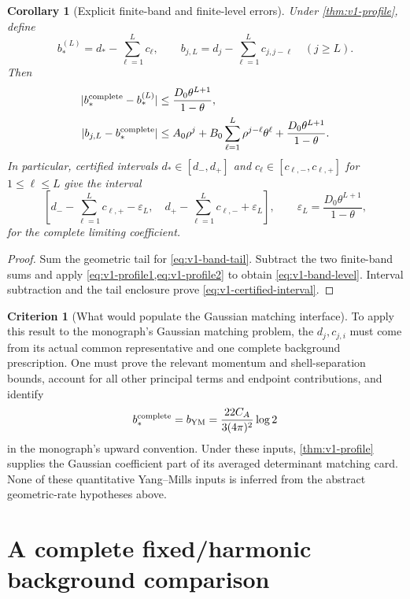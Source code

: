 \documentclass[11pt,a4paper]{article}
\newtheorem{corollary}[corollary]{Corollary}
\theoremstyle{definition}
\newtheorem{criterion}[criterion]{Criterion}
\theoremstyle{remark}
\begin{document}
\begin{corollary}[Explicit finite-band and finite-level errors]
\label{cor:v1-band}
Under \cref{thm:v1-profile}, define
\[
 b_*^{(L)}=d_*-\sum_{\ell=1}^{L}c_\ell,\qquad
 b_{j,L}=d_j-\sum_{\ell=1}^{L}c_{j,j-\ell}\quad(j\ge L).
\]
Then
\begin{align}
 |b_*^{\rm complete}-b_*^{(L)}|
       &\le \frac{D_0\theta^{L+1}}{1-\theta},\label{eq:v1-band-tail}\\
 |b_{j,L}-b_*^{\rm complete}|
       &\le A_0\rho^j
          +B_0\sum_{\ell=1}^{L}\rho^{j-\ell}\theta^\ell
          +\frac{D_0\theta^{L+1}}{1-\theta}.
                                             \label{eq:v1-band-level}
\end{align}
In particular, certified intervals
$d_*\in[d_-,d_+]$ and $c_\ell\in[c_{\ell,-},c_{\ell,+}]$ for
$1\le\ell\le L$ give the interval
\begin{equation}\label{eq:v1-certified-interval}
 \left[d_- -\sum_{\ell=1}^{L}c_{\ell,+}-\varepsilon_L,\quad
       d_+ -\sum_{\ell=1}^{L}c_{\ell,-}+\varepsilon_L\right],
 \qquad \varepsilon_L=\frac{D_0\theta^{L+1}}{1-\theta},
\end{equation}
for the complete limiting coefficient.
\end{corollary}
\begin{proof}
Sum the geometric tail for \cref{eq:v1-band-tail}. Subtract the two
finite-band sums and apply \cref{eq:v1-profile1,eq:v1-profile2} to obtain
\cref{eq:v1-band-level}. Interval subtraction and the tail enclosure
prove \cref{eq:v1-certified-interval}.
\end{proof}

\begin{criterion}[What would populate the Gaussian matching interface]
\label{crit:v1-YM}
To apply this result to the monograph's Gaussian matching problem, the
$d_j,c_{j,i}$ must come from its actual common representative and one
complete background prescription. One must prove the relevant momentum
and shell-separation bounds, account for all other principal terms and
endpoint contributions, and identify
\[
       b_*^{\rm complete}
          =b_{\rm YM}=\frac{22C_A}{3(4\pi)^2}\log2
\]
in the monograph's upward convention. Under these inputs,
\cref{thm:v1-profile} supplies the Gaussian coefficient part of its
averaged determinant matching card. None of these quantitative
Yang--Mills inputs is inferred from the abstract geometric-rate
hypotheses above.
\end{criterion}

\section{A complete fixed/harmonic background comparison}
\label{sec:v1-background}
\end{document}
